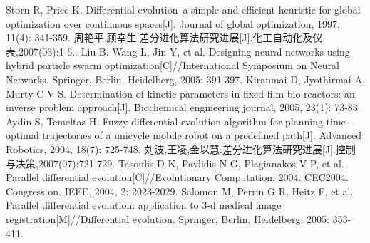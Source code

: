 \documentclass[a4paper,11pt,onecolumn,twoside]{article}
\begin{document}
\begin{CJK*}{GBK}{song}
\begin{multicols}{2}
\begin{thebibliography}{99}
Storn R, Price K. Differential evolution–a simple and efficient heuristic for global 
optimization over continuous spaces[J]. Journal of global optimization, 1997, 11(4): 341-359.
周艳平,顾幸生.差分进化算法研究进展[J].化工自动化及仪表,2007(03):1-6..
Liu B, Wang L, Jin Y, et al. Designing neural networks using hybrid particle swarm 
optimization[C]//International Symposium on Neural Networks. Springer, Berlin, Heidelberg, 2005: 391-397.
Kiranmai D, Jyothirmai A, Murty C V S. Determination of kinetic parameters in 
fixed-film bio-reactors: an inverse problem approach[J]. Biochemical engineering journal, 2005, 23(1): 73-83.
Aydin S, Temeltas H. Fuzzy-differential evolution algorithm for planning 
time-optimal trajectories of a unicycle mobile robot on a predefined path[J]. Advanced Robotics, 2004, 18(7): 725-748.
刘波,王凌,金以慧.差分进化算法研究进展[J].控制与决策,2007(07):721-729.
Tasoulis D K, Pavlidis N G, Plagianakos V P, et al. Parallel differential 
evolution[C]//Evolutionary Computation, 2004. CEC2004. Congress on. IEEE, 2004, 2: 2023-2029.
Salomon M, Perrin G R, Heitz F, et al. Parallel differential evolution: application 
to 3-d medical image registration[M]//Differential evolution. Springer, Berlin, Heidelberg, 2005: 353-411.

\end{thebibliography}
\end{multicols}
\clearpage
\end{CJK*}
\end{document}
